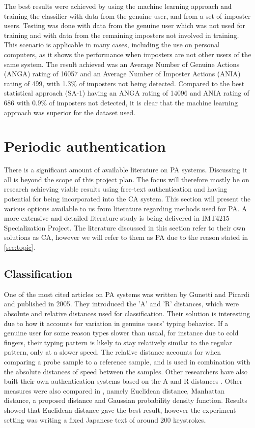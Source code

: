 \documentclass[informationsecurity]{gucmasterproject}
\begin{document}
The best results were achieved by using the machine learning approach and training the classifier with data from the genuine user, and from a set of imposter users.
Testing was done with data from the genuine user which was not used for training and with data from the remaining imposters not involved in training.
This scenario is applicable in many cases, including the use on personal computers, as it shows the performance when imposters are not other users of the same system.
The result achieved was an Average Number of Genuine Actions (ANGA) rating of 16057 and an Average Number of Imposter Actions (ANIA) rating of 499, with 1.3\% of imposters not being detected.
Compared to the best statistical approach (SA-1) having an ANGA rating of 14096 and ANIA rating of 686 with 0.9\% of imposters not detected, it is clear that the machine learning approach was superior for the dataset used.

\section{Periodic authentication}
There is a significant amount of available literature on PA systems.
Discussing it all is beyond the scope of this project plan. The focus will therefore mostly be on research achieving viable results using free-text authentication and having potential for being incorporated into the CA system.
This section will present the various options available to us from literature regarding methods used for PA.
A more extensive and detailed literature study is being delivered in IMT4215 Specialization Project.
The literature discussed in this section refer to their own solutions as CA, however we will refer to them as PA due to the reason stated in \autoref{sec:topic}.

\subsection{Classification}
One of the most cited articles on PA systems was written by Gunetti and Picardi \cite{gunettiPicardi} and published in 2005.
They introduced the 'A' and 'R' distances, which were absolute and relative distances used for classification.
Their solution is interesting due to how it accounts for variation in genuine users' typing behavior.
If a genuine user for some reason types slower than usual, for instance due to cold fingers, their typing pattern is likely to stay relatively similar to the regular pattern, only at a slower speed.
The relative distance accounts for when comparing a probe sample to a reference sample, and is used in combination with the absolute distances of speed between the samples.
Other researchers have also built their own authentication systems based on the A and R distances \cite{Kolakowska2011, Messerman, meaningless, prettyBadPaper, Davoudi1, Davoudi2, superResults}.
Other measures were also compared in \cite{Kaneko}, namely Euclidean distance, Manhattan distance, a proposed distance and Gaussian probability density function. Results showed that Euclidean distance gave the best result, however the experiment setting was writing a fixed Japanese text of around 200 keystrokes.
\end{document}
